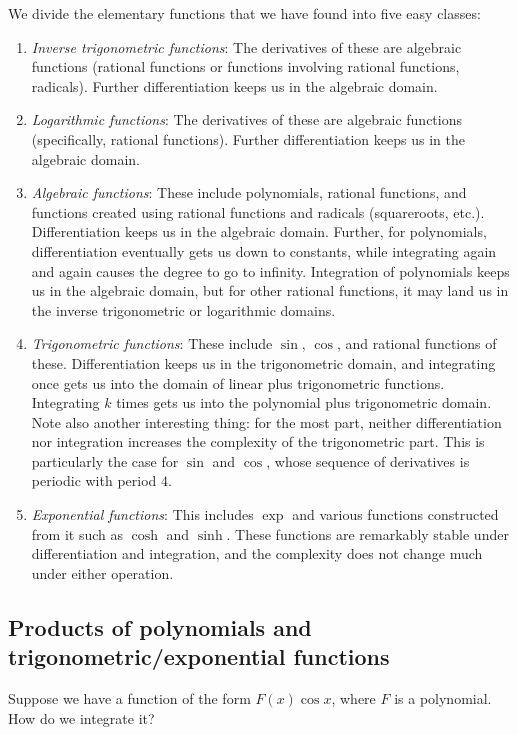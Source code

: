 \documentclass{amsart}
\begin{document}
We divide the elementary functions that we have found into five easy
classes:

\begin{enumerate}
\item {\em Inverse trigonometric functions}: The derivatives of these
  are algebraic functions (rational functions or functions involving
  rational functions, radicals). Further differentiation keeps us in
  the algebraic domain.
\item {\em Logarithmic functions}: The derivatives of these are
  algebraic functions (specifically, rational functions). Further
  differentiation keeps us in the algebraic domain.
\item {\em Algebraic functions}: These include polynomials, rational
  functions, and functions created using rational functions and
  radicals (squareroots, etc.). Differentiation keeps us in the
  algebraic domain. Further, for polynomials, differentiation
  eventually gets us down to constants, while integrating again and
  again causes the degree to go to infinity. Integration of
  polynomials keeps us in the algebraic domain, but for other rational
  functions, it may land us in the inverse trigonometric or
  logarithmic domains.
\item {\em Trigonometric functions}: These include $\sin$, $\cos$, and
  rational functions of these. Differentiation keeps us in the
  trigonometric domain, and integrating once gets us into the domain
  of linear plus trigonometric functions. Integrating $k$ times gets
  us into the polynomial plus trigonometric domain. Note also another
  interesting thing: for the most part, neither differentiation nor
  integration increases the complexity of the trigonometric part. This
  is particularly the case for $\sin$ and $\cos$, whose sequence of
  derivatives is periodic with period $4$.
\item {\em Exponential functions}: This includes $\exp$ and various
  functions constructed from it such as $\cosh$ and $\sinh$. These
  functions are remarkably stable under differentiation and
  integration, and the complexity does not change much under either
  operation.
\end{enumerate}

\subsection{Products of polynomials and trigonometric/exponential functions}

Suppose we have a function of the form $F(x)\cos x$, where $F$ is a
polynomial. How do we integrate it?
\end{document}
